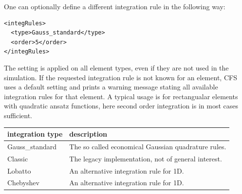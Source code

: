 One can optionally define a different integration rule in the following way:
\begin{verbatim}
<integRules>
  <type>Gauss_standard</type>
  <order>5</order>
</integRules>
\end{verbatim}

The setting is applied on all element types, even if they are not used in the simulation. If the requested integration rule is not known for an element, CFS uses a default setting and prints a warning message stating all available integration rules for that element. A typical usage is for rectangualar elements with quadratic ansatz functions, here second order integration is in most cases sufficient.

\begin{center}
\begin{tabular}{l|l}
integration type & description \\
\hline
Gauss\_standard & The so called economical Gaussian quadrature rules. \\
Classic & The legacy implementation, not of general interest. \\
Lobatto & An alternative integration rule for 1D. \\
Chebyshev & An alternative integration rule for 1D. \\
\end{tabular}
\end{center}

